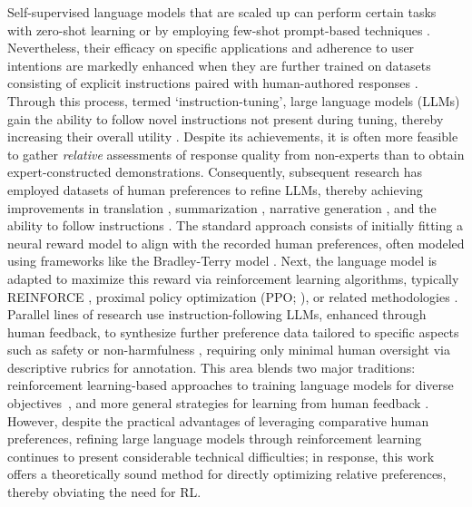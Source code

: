 Self-supervised language models that are scaled up can perform certain tasks with zero-shot learning \citep{radford2019language} or by employing few-shot prompt-based techniques \citep{gpt3,megatron,chowdhery2022palm}. Nevertheless, their efficacy on specific applications and adherence to user intentions are markedly enhanced when they are further trained on datasets consisting of explicit instructions paired with human-authored responses \citep{mishra-etal-2022-cross,sanh2022multitask,chung2022scaling,thoppilan2022lamda}. Through this process, termed `instruction-tuning', large language models (LLMs) gain the ability to follow novel instructions not present during tuning, thereby increasing their overall utility \citep{chung2022scaling}. Despite its achievements, it is often more feasible to gather \textit{relative} assessments of response quality from non-experts than to obtain expert-constructed demonstrations. Consequently, subsequent research has employed datasets of human preferences to refine LLMs, thereby achieving improvements in translation \citep{kreutzer-etal-2018-reliability}, summarization \citep{stiennon2022learning,ziegler2020finetuning}, narrative generation \citep{ziegler2020finetuning}, and the ability to follow instructions \citep{ouyang2022training,ramamurthy2023is}. The standard approach consists of initially fitting a neural reward model to align with the recorded human preferences, often modeled using frameworks like the Bradley-Terry model \citep{bradley1952rankanalysis}. Next, the language model is adapted to maximize this reward via reinforcement learning algorithms, typically REINFORCE \citep{williams1992reinforce}, proximal policy optimization (PPO; \cite{schulman2017proximal}), or related methodologies \citep{ramamurthy2023is}. Parallel lines of research use instruction-following LLMs, enhanced through human feedback, to synthesize further preference data tailored to specific aspects such as safety or non-harmfulness \citep{bai2022constitutional}, requiring only minimal human oversight via descriptive rubrics for annotation. This area blends two major traditions: reinforcement learning-based approaches to training language models for diverse objectives~\citep{Ranzato2015SequenceLT,paulus2018a,wu2018learning}, and more general strategies for learning from human feedback \citep{christiano2017deep,kupcsik2018learning}. However, despite the practical advantages of leveraging comparative human preferences, refining large language models through reinforcement learning continues to present considerable technical difficulties; in response, this work offers a theoretically sound method for directly optimizing relative preferences, thereby obviating the need for RL.

